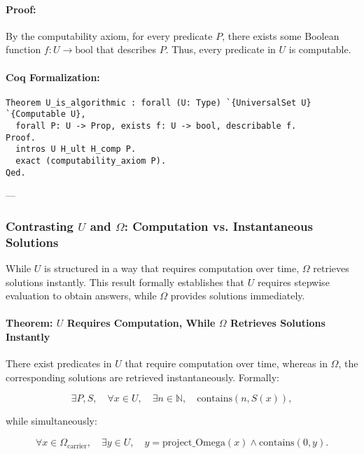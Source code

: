 \documentclass[12pt]{article}
\begin{document}
\paragraph{Proof:}
By the computability axiom, for every predicate \( P \), there exists some Boolean function \( f: U \to \text{bool} \) that describes \( P \). Thus, every predicate in \( U \) is computable.

\paragraph{Coq Formalization:}
\begin{lstlisting}[language=Coq]
Theorem U_is_algorithmic : forall (U: Type) `{UniversalSet U} `{Computable U},
  forall P: U -> Prop, exists f: U -> bool, describable f.
Proof.
  intros U H_ult H_comp P.
  exact (computability_axiom P).
Qed.
\end{lstlisting}

---

\subsubsection{Contrasting \( U \) and \( \Omega \): Computation vs. Instantaneous Solutions}

While \( U \) is structured in a way that requires computation over time, \( \Omega \) retrieves solutions instantly. This result formally establishes that \( U \) requires stepwise evaluation to obtain answers, while \( \Omega \) provides solutions immediately.

\paragraph{Theorem: \( U \) Requires Computation, While \( \Omega \) Retrieves Solutions Instantly}
There exist predicates in \( U \) that require computation over time, whereas in \( \Omega \), the corresponding solutions are retrieved instantaneously. Formally:

\begin{equation}
    \exists P, S, \quad \forall x \in U, \quad \exists n \in \mathbb{N}, \quad \text{contains}(n, S(x)),
\end{equation}

while simultaneously:

\begin{equation}
    \forall x \in \Omega_{\text{carrier}}, \quad \exists y \in U, \quad y = \text{project\_Omega}(x) \wedge \text{contains}(0, y).
\end{equation}
\end{document}
